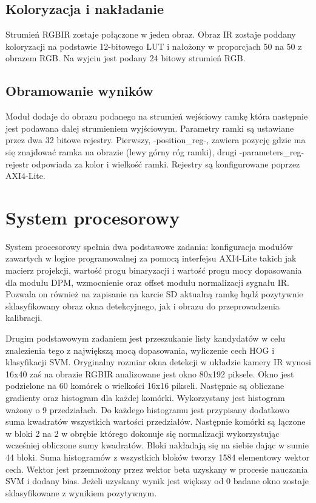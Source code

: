 \subsection{Koloryzacja i nakładanie}
Strumień RGBIR zostaje połączone w jeden obraz. Obraz IR zostaje poddany koloryzacji na podstawie 12-bitowego LUT i nałożony w proporcjach 50 na 50 z obrazem RGB. Na wyjciu jest podany 24 bitowy strumień RGB.

\subsection{Obramowanie wyników}
Moduł dodaje do obrazu podanego na strumień wejściowy ramkę która następnie jest podawana dalej strumieniem wyjściowym. Parametry ramki są ustawiane przez dwa 32 bitowe rejestry. Pierwszy, -position\_reg-, zawiera pozycję gdzie ma się znajdować ramka na obrazie (lewy górny róg ramki), drugi -parameters\_reg- rejestr odpowiada za kolor i wielkość ramki. Rejestry są konfigurowane poprzez AXI4-Lite.

\section{System procesorowy}

System procesorowy spełnia dwa podstawowe zadania: konfiguracja modułów zawartych w logice programowalnej za pomocą interfejsu AXI4-Lite takich jak macierz projekcji, wartość progu binaryzacji i wartość progu mocy dopasowania dla modułu DPM, wzmocnienie oraz offset modułu normalizacji sygnału IR. Pozwala on również na zapisanie na karcie SD aktualną ramkę bądź pozytywnie sklasyfikowany obraz okna detekcyjnego, jak i obrazu do przeprowadzenia kalibracji.

Drugim podstawowym zadaniem jest przeszukanie listy kandydatów w celu znalezienia tego z największą mocą dopasowania, wyliczenie cech HOG i klasyfikacji SVM. Oryginalny rozmiar okna detekcji w układzie kamery IR wynosi 16x40 zaś na obrazie RGBIR analizowane jest okno 80x192 piksele. Okno jest podzielone na 60 komórek o wielkości 16x16 pikseli. Następnie są obliczane gradienty oraz histogram dla każdej komórki. Wykorzystany jest histogram ważony o 9 przedziałach. Do każdego histogramu jest przypisany dodatkowo suma kwadratów wszystkich wartości przedziałów. Następnie komórki są łączone w bloki 2 na 2 w obrębie którego dokonuje się normalizacji wykorzystując wcześniej obliczone sumy kwadratów. Bloki nakładają się na siebie dając w sumie 44 bloki. Suma histogramów z wszystkich bloków tworzy 1584 elementowy wektor cech. Wektor jest przemnożony przez wektor beta uzyskany w procesie nauczania SVM i dodany bias. Jeżeli uzyskany wynik jest większy od 0 badane okno zostaje sklasyfikowane z wynikiem pozytywnym.

